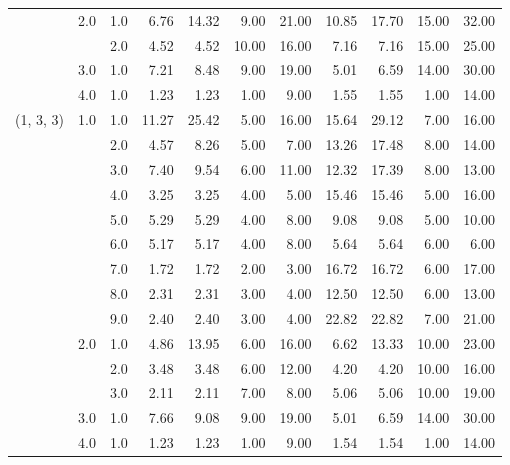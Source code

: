 \begin{tabular}{lllrrrrrrrr}
          & 2.0 & 1.0  &       6.76 &     14.32 &  9.00 &  21.00 &      10.85 &     17.70 & 15.00 &  32.00 \\
          &     & 2.0  &       4.52 &      4.52 & 10.00 &  16.00 &       7.16 &      7.16 & 15.00 &  25.00 \\
          & 3.0 & 1.0  &       7.21 &      8.48 &  9.00 &  19.00 &       5.01 &      6.59 & 14.00 &  30.00 \\
          & 4.0 & 1.0  &       1.23 &      1.23 &  1.00 &   9.00 &       1.55 &      1.55 &  1.00 &  14.00 \\
(1, 3, 3) & 1.0 & 1.0  &      11.27 &     25.42 &  5.00 &  16.00 &      15.64 &     29.12 &  7.00 &  16.00 \\
          &     & 2.0  &       4.57 &      8.26 &  5.00 &   7.00 &      13.26 &     17.48 &  8.00 &  14.00 \\
          &     & 3.0  &       7.40 &      9.54 &  6.00 &  11.00 &      12.32 &     17.39 &  8.00 &  13.00 \\
          &     & 4.0  &       3.25 &      3.25 &  4.00 &   5.00 &      15.46 &     15.46 &  5.00 &  16.00 \\
          &     & 5.0  &       5.29 &      5.29 &  4.00 &   8.00 &       9.08 &      9.08 &  5.00 &  10.00 \\
          &     & 6.0  &       5.17 &      5.17 &  4.00 &   8.00 &       5.64 &      5.64 &  6.00 &   6.00 \\
          &     & 7.0  &       1.72 &      1.72 &  2.00 &   3.00 &      16.72 &     16.72 &  6.00 &  17.00 \\
          &     & 8.0  &       2.31 &      2.31 &  3.00 &   4.00 &      12.50 &     12.50 &  6.00 &  13.00 \\
          &     & 9.0  &       2.40 &      2.40 &  3.00 &   4.00 &      22.82 &     22.82 &  7.00 &  21.00 \\
          & 2.0 & 1.0  &       4.86 &     13.95 &  6.00 &  16.00 &       6.62 &     13.33 & 10.00 &  23.00 \\
          &     & 2.0  &       3.48 &      3.48 &  6.00 &  12.00 &       4.20 &      4.20 & 10.00 &  16.00 \\
          &     & 3.0  &       2.11 &      2.11 &  7.00 &   8.00 &       5.06 &      5.06 & 10.00 &  19.00 \\
          & 3.0 & 1.0  &       7.66 &      9.08 &  9.00 &  19.00 &       5.01 &      6.59 & 14.00 &  30.00 \\
          & 4.0 & 1.0  &       1.23 &      1.23 &  1.00 &   9.00 &       1.54 &      1.54 &  1.00 &  14.00 \\

\end{tabular}
